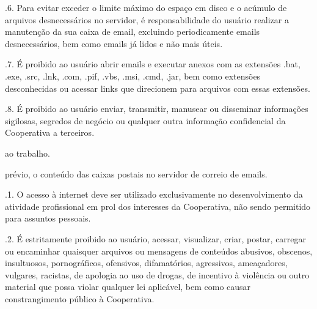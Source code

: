 \documentclass[letterpaper,10pt,portuges]{sphinxmanual}
\begin{document}
.6. Para evitar exceder o limite máximo do espaço em disco e o acúmulo de arquivos desnecessários no servidor, é
responsabilidade do usuário realizar a manutenção da sua caixa de e\sphinxhyphen{}mail, excluindo periodicamente e\sphinxhyphen{}mails
desnecessários, bem como e\sphinxhyphen{}mails já lidos e não mais úteis.

.7. É proibido ao usuário abrir e\sphinxhyphen{}mails e executar anexos com as extensões .bat, .exe, .src, .lnk, .com,
.pif, .vbs, .msi, .cmd, .jar, bem como extensões desconhecidas ou acessar links que direcionem para arquivos
com essas extensões.

.8. É proibido ao usuário enviar, transmitir, manusear ou disseminar informações sigilosas, segredos de negócio
ou qualquer outra informação confidencial da Cooperativa a terceiros.
\begin{description}
\begin{description}
\sphinxAtStartPar
ao trabalho.

\end{description}

\sphinxAtStartPar
prévio, o conteúdo das caixas postais no servidor de correio de e\sphinxhyphen{}mails.

\end{description}

.1. O acesso à internet deve ser utilizado exclusivamente no desenvolvimento da atividade profissional em prol dos interesses da Cooperativa, não sendo permitido para assuntos pessoais.

.2. É estritamente proibido ao usuário, acessar, visualizar, criar, postar, carregar ou encaminhar quaisquer arquivos ou mensagens de conteúdos abusivos, obscenos, insultuosos, pornográficos, ofensivos, difamatórios, agressivos, ameaçadores, vulgares, racistas, de apologia ao uso de drogas, de incentivo à violência ou outro material que possa violar qualquer lei aplicável, bem como causar constrangimento público à Cooperativa.
\end{document}

